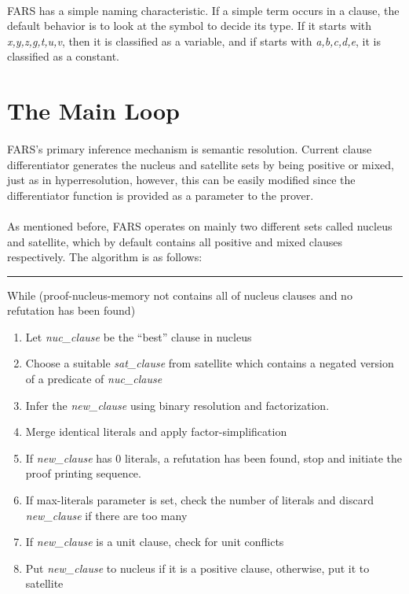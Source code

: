 \documentclass[11pt]{report}
\begin{document}
\paragraph{} FARS has a simple naming characteristic. If a simple term occurs in a clause, the default behavior is to look at the symbol to decide its type. If it starts with \emph{x,y,z,g,t,u,v}, then it is classified as a variable, and if starts with \emph{a,b,c,d,e}, it is classified as a constant.

\section{The Main Loop}
\label{section:mainloop}

\paragraph{} FARS's primary inference mechanism is semantic resolution. Current clause differentiator generates the nucleus and satellite sets by being positive or mixed, just as in hyperresolution, however, this can be easily modified since the differentiator function is provided as a parameter to the prover. 

\paragraph{} As mentioned before, FARS operates on mainly two different sets called nucleus and satellite, which by default contains all positive and mixed clauses respectively. The algorithm is as follows: \newline

\hrule \vspace{2mm}
While (proof-nucleus-memory not contains all of nucleus clauses and no refutation has been found)
\begin{enumerate}
 \item Let \textit{nuc\_clause} be the ``best'' clause in nucleus
 \item Choose a suitable \textit{sat\_clause} from satellite which contains a negated version of a predicate of \textit{nuc\_clause}
 \item Infer the \textit{new\_clause} using binary resolution and factorization. 
 \item Merge identical literals and apply factor-simplification
 \item If \textit{new\_clause} has 0 literals, a refutation has been found, stop and initiate the proof printing sequence.
 \item If max-literals parameter is set, check the number of literals and discard \textit{new\_clause} if there are too many
 \item If \textit{new\_clause} is a unit clause, check for unit conflicts
 \item Put \textit{new\_clause} to nucleus if it is a positive clause, otherwise, put it to satellite
\end{enumerate}
\end{document}
